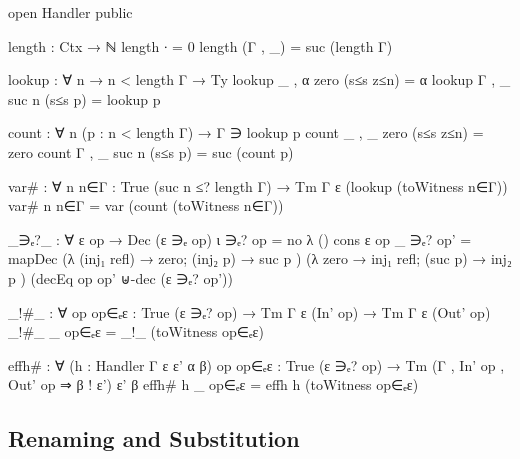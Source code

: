 \documentclass[a4paper,11pt]{article}
\begin{document}
\begin{code}[hide]
  open Handler public

  length : Ctx → ℕ
  length ∙ = 0
  length (Γ , _) = suc (length Γ)

  lookup : ∀ {n} → n < length Γ → Ty
  lookup {_ , α} {zero} (s≤s z≤n) = α
  lookup {Γ , _} {suc n} (s≤s p) = lookup p

  count : ∀ {n} (p : n < length Γ) → Γ ∋ lookup p
  count {_ , _} {zero} (s≤s z≤n) = zero
  count {Γ , _} {suc n} (s≤s p) = suc (count p)

  var# : ∀ n {n∈Γ : True (suc n ≤? length Γ)} → Tm Γ ε (lookup (toWitness n∈Γ))
  var# n {n∈Γ} = var (count (toWitness n∈Γ))

  _∋ₑ?_ : ∀ ε op → Dec (ε ∋ₑ op)
  ι ∋ₑ? op = no λ ()
  cons ε op _ ∋ₑ? op' = mapDec
    (λ { (inj₁ refl) → zero; (inj₂ p) → suc p })
    (λ { zero → inj₁ refl; (suc p) → inj₂ p })
    (decEq op op' ⊎-dec (ε ∋ₑ? op'))

  _!#_ : ∀ op {op∈ₑε : True (ε ∋ₑ? op)} → Tm Γ ε (In' op) → Tm Γ ε (Out' op)
  _!#_ _ {op∈ₑε} = _!_ (toWitness op∈ₑε)

  effh# : ∀ (h : Handler Γ ε ε' α β) op {op∈ₑε : True (ε ∋ₑ? op)}
    → Tm (Γ , In' op , Out' op ⇒ β ! ε') ε' β
  effh# h _ {op∈ₑε} = effh h (toWitness op∈ₑε)
\end{code}

\subsection{Renaming and Substitution}
\end{document}
